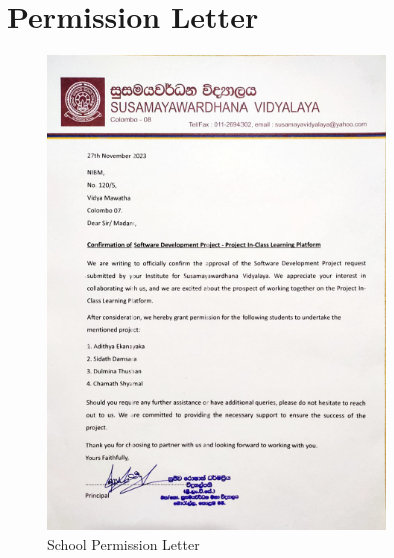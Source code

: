 \documentclass[12pt,a4paper]{report}
\begin{document}
\section{Permission Letter}

\begin{figure}[htbp]
    \centering
    \includegraphics[width=0.8\textwidth]{school-permission-lettter.png}
    \caption{School Permission Letter}
    \label{fig:permission-letter}
\end{figure}

\end{document}
